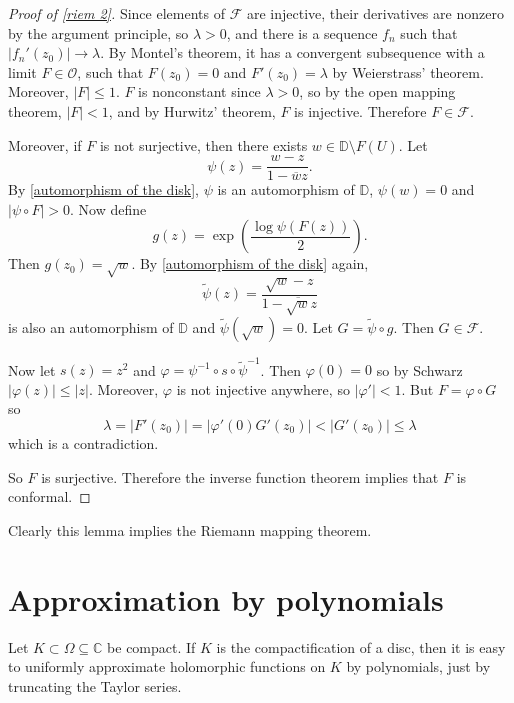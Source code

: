\documentclass[12pt]{report}
\newcommand{\CC}{\mathbb{C}}
\newcommand{\DD}{\mathbb{D}}
\newcommand{\FF}{\mathcal{F}}
\newcommand{\OO}{\mathcal{O}}
\theoremstyle{definition}
\begin{document}
\begin{proof}[Proof of \ref{riem 2}]
Since elements of $\FF$ are injective, their derivatives are nonzero by the argument principle, so $\lambda > 0$, and there is a sequence $f_n$ such that $|f_n'(z_0)| \to \lambda$. By Montel's theorem, it has a convergent subsequence with a limit $F \in \OO$, such that $F(z_0) = 0$ and $F'(z_0) = \lambda$ by Weierstrass' theorem. Moreover, $|F| \leq 1$. $F$ is nonconstant since $\lambda > 0$, so by the open mapping theorem, $|F| < 1$, and by Hurwitz' theorem, $F$ is injective. Therefore $F \in \FF$.

Moreover, if $F$ is not surjective, then there exists $w \in \DD \setminus F(U)$. Let
$$\psi(z) = \frac{w - z}{1 - \overline wz}.$$
By \ref{automorphism of the disk}, $\psi$ is an automorphism of $\DD$, $\psi(w) = 0$ and $|\psi \circ F| > 0$. Now define
$$g(z) = \exp\left(\frac{\log \psi(F(z))}{2}\right).$$
Then $g(z_0) = \sqrt w$.
By \ref{automorphism of the disk} again,
$$\tilde \psi(z) = \frac{\sqrt w - z}{1 - \overline{\sqrt w} z}$$
is also an automorphism of $\DD$ and $\tilde \psi(\sqrt w) = 0$. Let $G = \tilde \psi \circ g$. Then $G \in \FF$.

Now let $s(z) = z^2$ and $\varphi = \psi^{-1} \circ s \circ \tilde \psi^{-1}$. Then $\varphi(0) = 0$ so by Schwarz $|\varphi(z)| \leq |z|$. Moreover, $\varphi$ is not injective anywhere, so $|\varphi'| < 1$. But $F = \varphi \circ G$ so
$$\lambda = |F'(z_0)| = |\varphi'(0) G'(z_0) | < |G'(z_0)| \leq \lambda$$
which is a contradiction.

So $F$ is surjective. Therefore the inverse function theorem implies that $F$ is conformal.
\end{proof}
Clearly this lemma implies the Riemann mapping theorem.




\section{Approximation by polynomials}
Let $K \subset \Omega \subseteq \CC$ be compact. If $K$ is the compactification of a disc, then it is easy to uniformly approximate holomorphic functions on $K$ by polynomials, just by truncating the Taylor series.
\end{document}
